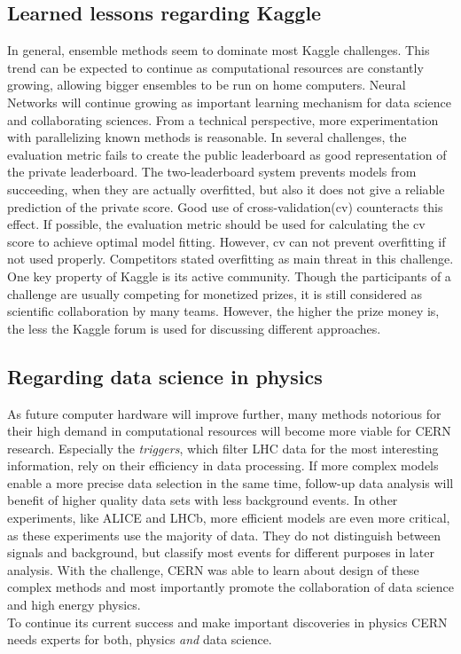 \subsection{Learned lessons regarding Kaggle}
In general, ensemble methods seem to dominate most Kaggle challenges. This trend can be expected to continue as computational resources are constantly growing, allowing bigger ensembles to be run on home computers. Neural Networks will continue growing as important learning mechanism for data science and collaborating sciences. From a technical perspective, more experimentation with parallelizing known methods is reasonable.
In several challenges, the evaluation metric fails to create the public leaderboard as good representation of the private leaderboard. The two-leaderboard system prevents models from succeeding, when they are actually overfitted, but also it does not give a reliable prediction of the private score. Good use of cross-validation(cv) counteracts this effect. If possible, the evaluation metric should be used for calculating the cv score to achieve optimal model fitting. However, cv can not prevent overfitting if not used properly. Competitors stated overfitting as main threat in this challenge\cite{melis-1st,blog}.
One key property of Kaggle is its active community. Though the participants of a challenge are usually competing for monetized prizes, it is still considered as scientific collaboration by many teams. However, the higher the prize money is, the less the Kaggle forum is used for discussing different approaches.

\subsection{Regarding data science in physics}
As future computer hardware will improve further, many methods notorious for their high demand in computational resources will become more viable for CERN research. Especially the \emph{triggers}, which filter LHC data for the most interesting information, rely on their efficiency in data processing. If more complex models enable a more precise data selection in the same time, follow-up data analysis will benefit of higher quality data sets with less background events.
In other experiments, like ALICE and LHCb, more efficient models are even more critical, as these experiments use the majority of data. They do not distinguish between signals and background, but classify most events for different purposes in later analysis\cite{glig14}. With the challenge, CERN was able to learn about design of these complex methods and most importantly promote the collaboration of data science and high energy physics.\\
To continue its current success and make important discoveries in physics CERN needs experts for both, physics \emph{and} data science.

